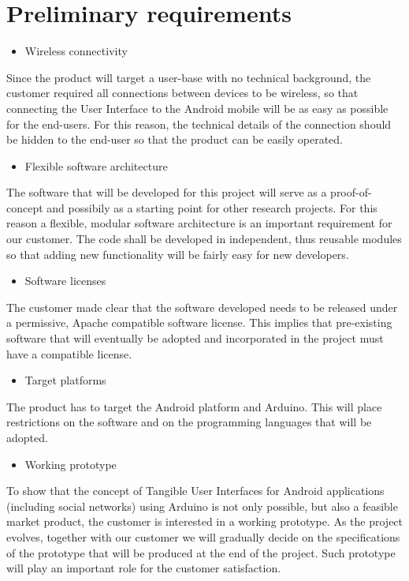 
\section{Preliminary requirements}
\begin{itemize}
\item Wireless connectivity
\end{itemize}
Since the product will target a user-base with no technical background,
the customer required all connections between devices to be wireless,
so that connecting the User Interface to the Android mobile will be
as easy as possible for the end-users. For this reason, the technical
details of the connection should be hidden to the end-user so that
the product can be easily operated.
\begin{itemize}
\item Flexible software architecture
\end{itemize}
The software that will be developed for this project will serve as
a proof-of-concept and possibily as a starting point for other research
projects. For this reason a flexible, modular software architecture
is an important requirement for our customer. The code shall be developed
in independent, thus reusable modules so that adding new functionality
will be fairly easy for new developers.
\begin{itemize}
\item Software licenses
\end{itemize}
The customer made clear that the software developed needs to be released
under a permissive, Apache compatible software license. This implies
that pre-existing software that will eventually be adopted and incorporated
in the project must have a compatible license.
\begin{itemize}
\item Target platforms
\end{itemize}
The product has to target the Android platform and Arduino.
This will place restrictions on the software and on the programming languages that will be adopted.

\newpage
\begin{itemize}
\item Working prototype
\end{itemize}
To show that the concept of Tangible User Interfaces for Android applications
(including social networks) using Arduino is not only possible, but
also a feasible market product, the customer is interested in a working
prototype. As the project evolves, together with our customer we will
gradually decide on the specifications of the prototype that will
be produced at the end of the project. Such prototype will play an
important role for the customer satisfaction.
